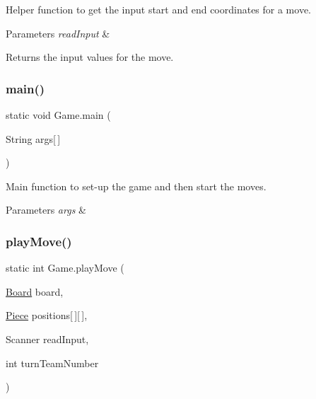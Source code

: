 Helper function to get the input start and end coordinates for a move. 
\begin{DoxyParams}{Parameters}
{\em read\+Input} & \\
\hline
\end{DoxyParams}
\begin{DoxyReturn}{Returns}
the input values for the move. 
\end{DoxyReturn}
\hypertarget{class_game_abe583b02e502ab32f197bb15bb73d833}{}\label{class_game_abe583b02e502ab32f197bb15bb73d833} 
\subsubsection{\texorpdfstring{main()}{main()}}
{\footnotesize\ttfamily static void Game.\+main (\begin{DoxyParamCaption}\item[{String}]{args\mbox{[}$\,$\mbox{]} }\end{DoxyParamCaption})\hspace{0.3cm}{\ttfamily [static]}}

Main function to set-\/up the game and then start the moves. 
\begin{DoxyParams}{Parameters}
{\em args} & \\
\hline
\end{DoxyParams}
\hypertarget{class_game_acc3e92decaf7544e911092ae1f666b5f}{}\label{class_game_acc3e92decaf7544e911092ae1f666b5f} 
\subsubsection{\texorpdfstring{play\+Move()}{playMove()}}
{\footnotesize\ttfamily static int Game.\+play\+Move (\begin{DoxyParamCaption}\item[{\hyperlink{class_framework_1_1_board}{Board}}]{board,  }\item[{\hyperlink{class_framework_1_1_pieces_1_1_piece}{Piece}}]{positions\mbox{[}$\,$\mbox{]}\mbox{[}$\,$\mbox{]},  }\item[{Scanner}]{read\+Input,  }\item[{int}]{turn\+Team\+Number }\end{DoxyParamCaption})\hspace{0.3cm}{\ttfamily [static]}}

